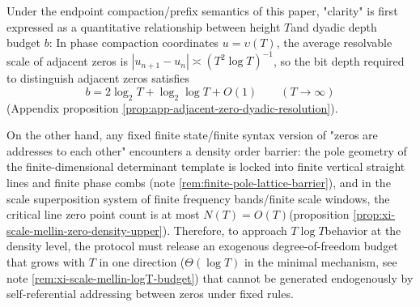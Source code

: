 \begin{remark}\label{rem:xi-resolution-height-finite-state-barrier}
Under the endpoint compaction/prefix semantics of this paper, "clarity" is first expressed as a quantitative relationship between height \(T\) ​​and dyadic depth budget \(b\): In phase compaction coordinates \(u=\upsilon(T)\), the average resolvable scale of adjacent zeros is \(|u_{n+1}-u_n|\asymp (T^{2}\log T)^{-1}\), so the bit depth required to distinguish adjacent zeros satisfies
\[
b=2\log_{2}T+\log_{2}\log T+O(1)
\qquad(T\to\infty)
\]
(Appendix proposition \ref{prop:app-adjacent-zero-dyadic-resolution}).
\par
On the other hand, any fixed finite state/finite syntax version of "zeros are addresses to each other" encounters a density order barrier: the pole geometry of the finite-dimensional determinant template is locked into finite vertical straight lines and finite phase combs (note \ref{rem:finite-pole-lattice-barrier}), and in the scale superposition system of finite frequency bands/finite scale windows, the critical line zero point count is at most \(N(T)=O(T)\) ​​(proposition \ref{prop:xi-scale-mellin-zero-density-upper}).
Therefore, to approach \(T\log T\) ​​behavior at the density level, the protocol must release an exogenous degree-of-freedom budget that grows with \(T\) in one direction (\(\Theta(\log T)\) in the minimal mechanism, see note \ref{rem:xi-scale-mellin-logT-budget}) that cannot be generated endogenously by self-referential addressing between zeros under fixed rules.
\end{remark}

